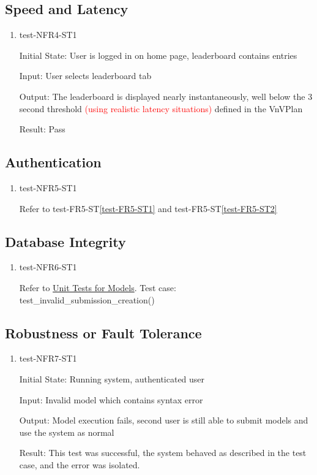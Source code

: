 \documentclass[12pt, titlepage]{article}
\begin{document}
\subsection{Speed and Latency}
\begin{enumerate}
\item{test-NFR4-ST1} \label{test-NFR4-ST1}

Initial State: User is logged in on home page, leaderboard contains entries

Input: User selects leaderboard tab

Output: The leaderboard is displayed nearly instantaneously, well below the 3 second threshold \textcolor{red}{(using realistic latency situations)} defined in the VnVPlan

Result: Pass

\end{enumerate}
\subsection{Authentication}
\begin{enumerate}
\item{test-NFR5-ST1} \label{test-NFR5-ST1}

Refer to test-FR5-ST\ref{test-FR5-ST1} and test-FR5-ST\ref{test-FR5-ST2}
\end{enumerate}
\subsection{Database Integrity}
\begin{enumerate}
\item{test-NFR6-ST1} \label{test-NFR6-ST1}

Refer to \href{https://github.com/AidanMariglia/SOCAlgoTestPlatform/blob/main/src/webserver/webserver/submissions/tests.py}{Unit Tests for Models}. Test case: test\_invalid\_submission\_creation() 

\end{enumerate}
\subsection{Robustness or Fault Tolerance}
\begin{enumerate}
\item{test-NFR7-ST1} \label{test-NFR7-ST1}


Initial State: Running system, authenticated user

Input: Invalid model which contains syntax error

Output: Model execution fails, second user is still able to submit models and use the system as normal

Result: This test was successful, the system behaved as described in the test case, and the error was isolated.

\end{enumerate}
\end{document}
